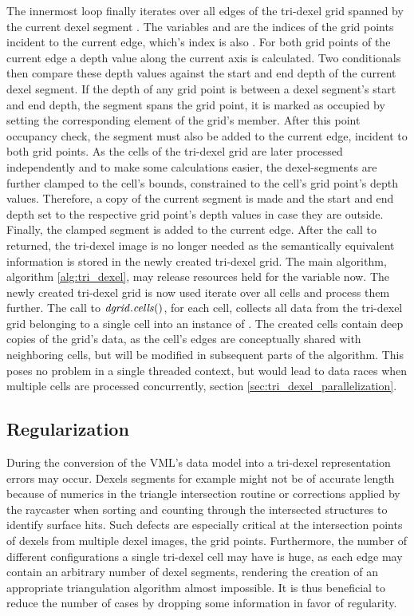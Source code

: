 The innermost loop finally iterates over all edges of the tri-dexel grid spanned by the current dexel segment .
The variables  and  are the indices of the grid points incident to the current edge, which's index is also .
For both grid points of the current edge a depth value along the current axis is calculated.
Two conditionals then compare these depth values against the start and end depth of the current dexel segment.
If the depth of any grid point is between a dexel segment's start and end depth, \ie the segment spans the grid point, it is marked as occupied by setting the corresponding element of the grid's  member.
After this point occupancy check, the segment must also be added to the current edge, incident to both grid points.
As the cells of the tri-dexel grid are later processed independently and to make some calculations easier, the dexel-segments are further clamped to the cell's bounds, \ie constrained to the cell's grid point's depth values.
Therefore, a copy of the current segment is made and the start and end depth set to the respective grid point's depth values in case they are outside.
Finally, the clamped segment is added to the current edge.
%
After the call to  returned, the tri-dexel image is no longer needed as the semantically equivalent information is stored in the newly created tri-dexel grid.
The main algorithm, algorithm \ref{alg:tri_dexel}, may release resources held for the  variable now.
The newly created tri-dexel grid  is now used iterate over all cells and process them further.
The call to $\mathit{dgrid}.\mathit{cells}()$, for each cell, collects all data from the tri-dexel grid belonging to a single cell into an instance of .
The created cells contain deep copies of the grid's data, as the cell's edges are conceptually shared with neighboring cells, but will be modified in subsequent parts of the algorithm.
This poses no problem in a single threaded context, but would lead to data races when multiple cells are processed concurrently, \cf section \ref{sec:tri_dexel_parallelization}.


\subsection{Regularization}
\label{sec:tri_dexel_regularization}

During the conversion of the VML's data model into a tri-dexel representation errors may occur.
Dexels segments for example might not be of accurate length because of numerics in the triangle intersection routine or corrections applied by the raycaster when sorting and counting through the intersected structures to identify surface hits.
Such defects are especially critical at the intersection points of dexels from multiple dexel images, the grid points.
Furthermore, the number of different configurations a single tri-dexel cell may have is huge, as each edge may contain an arbitrary number of dexel segments, rendering the creation of an appropriate triangulation algorithm almost impossible.
It is thus beneficial to reduce the number of cases by dropping some information in favor of regularity.

